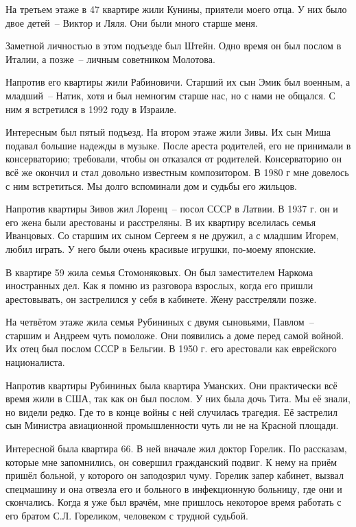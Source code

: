 На третьем этаже в 47 квартире жили Кунины, приятели моего отца. У них было двое детей~-- Виктор и Ляля. Они были много старше меня.

Заметной личностью в этом подъезде был Штейн. Одно время он был послом в Италии, а позже~-- личным советником Молотова.

Напротив его квартиры жили Рабиновичи. Старший их сын Эмик был военным, а младший~-- Натик, хотя и был немногим старше нас, но с нами не общался. С ним я встретился в 1992 году в Израиле.

Интересным был пятый подъезд. На втором этаже жили Зивы. Их сын Миша подавал большие надежды в музыке. После ареста родителей, его не принимали в консерваторию; требовали, чтобы он отказался от родителей. Консерваторию он всё же окончил и стал довольно известным композитором. В 1980 г мне довелось с ним встретиться. Мы долго вспоминали дом и судьбы его жильцов.

Напротив квартиры Зивов жил Лоренц~-- посол СССР в Латвии. В 1937 г. он и его жена были арестованы и расстреляны. В их квартиру вселилась семья Иванцовых. Со старшим их сыном Сергеем я не дружил, а с младшим Игорем, любил играть. У него были очень красивые игрушки, по-моему японские.

В квартире 59 жила семья Стомоняковых. Он был заместителем Наркома иностранных дел. Как я помню из разговора взрослых, когда его пришли арестовывать, он застрелился у себя в кабинете. Жену расстреляли позже.

На четвётом этаже жила семья Рубининых с двумя сыновьями, Павлом~-- старшим и Андреем чуть помоложе. Они появились а доме перед самой войной. Их отец был послом СССР в Бельгии. В 1950 г. его арестовали как еврейского националиста.

Напротив квартиры Рубининых была квартира Уманских. Они практически всё время жили в США, так как он был послом. У них была дочь Тита. Мы её знали, но видели редко. Где то в конце войны с ней случилась трагедия. Её застрелил сын Министра авиационной промышленности чуть ли не на Красной площади.

Интересной была квартира 66. В ней вначале жил доктор Горелик. По рассказам, которые мне запомнились, он совершил гражданский подвиг. К нему на приём пришёл больной, у которого он заподозрил чуму. Горелик запер кабинет, вызвал спецмашину и она отвезла его и больного в инфекционную больницу, где они и скончались. Когда я уже был врачём, мне пришлось некоторое время работать с его братом С.Л. Гореликом, человеком с трудной судьбой.

